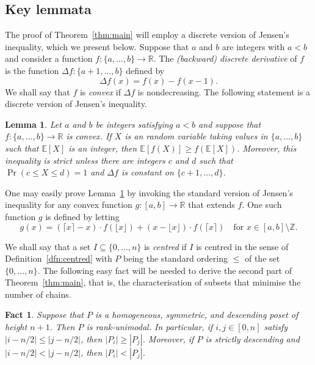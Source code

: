 \documentclass[11pt,a4paper,reqno]{amsart}
\newtheorem{fact}[thm]{Fact}
\newtheorem{lemma}[thm]{Lemma}
\numberwithin{claim}{thm}
\theoremstyle{definition}
\newcommand{\Int}{\mathbb{Z}}
\newcommand{\Reals}{\mathbb{R}}
\newcommand{\Ex}{\mathbb{E}}
\renewcommand{\le}{\leqslant}
\renewcommand{\ge}{\geqslant}
\begin{document}
\subsection{Key lemmata}
\label{sec:key-lemmas}

The proof of Theorem~\ref{thm:main} will employ a discrete version of Jensen's inequality, which we present below. Suppose that $a$ and $b$ are integers with $a < b$ and consider a function $f \colon \{a, \dotsc, b\} \to \Reals$. The \emph{(backward) discrete derivative} of $f$ is the function $\Delta f \colon \{a+1, \dotsc, b\}$ defined by
\[
  \Delta f(x) = f(x) - f(x-1).
\]
We shall say that $f$ is \emph{convex} if $\Delta f$ is nondecreasing. The following statement is a discrete version of Jensen's inequality.

\begin{lemma}
  \label{lemma:Jensen}
  Let $a$ and $b$ be integers satisfying $a < b$ and suppose that $f \colon \{a, \dotsc, b\} \to \Reals$ is convex. If $X$ is an random variable taking values in $\{a, \dotsc, b\}$ such that $\Ex[X]$ is an integer, then $\Ex[f(X)] \ge f(\Ex[X])$. Moreover, this inequality is strict unless there are integers $c$ and $d$ such that $\Pr(c \le X \le d) = 1$ and $\Delta f$ is constant on $\{c+1, \dotsc, d\}$.
\end{lemma}

One may easily prove Lemma~\ref{lemma:Jensen} by invoking the standard version of Jensen's inequality for any convex function $g \colon [a,b] \to \Reals$ that extends $f$. One such function $g$ is defined by letting
\[
  g(x) = \left(\lceil x \rceil - x\right) \cdot f\left(\lfloor x \rfloor\right) + \left(x - \lfloor x \rfloor\right) \cdot f\left(\lceil x \rceil\right) \quad \text{for $x \in [a,b] \setminus \Int$}.
\]

We shall say that a set $I \subseteq \{0, \dotsc, n\}$ is \emph{centred} if $I$ is centred in the sense of Definition~\ref{dfn:centred} with $P$ being the standard ordering $\le$ of the set $\{0, \dotsc, n\}$. The following easy fact will be needed to derive the second part of Theorem~\ref{thm:main}, that is, the characterisation of subsets that minimise the number of chains.

\begin{fact}
  \label{fact:descending-unimodal}
  Suppose that $P$ is a homogeneous, symmetric, and descending poset of height $n+1$. Then $P$ is rank-unimodal. In particular, if $i, j \in [0,n]$ satisfy $|i-n/2| \le |j - n/2|$, then $|P_i| \ge |P_j|$. Moreover, if $P$ is strictly descending and $|i - n/2| < |j - n/2|$, then $|P_i| < |P_j|$.
\end{fact}
\end{document}
